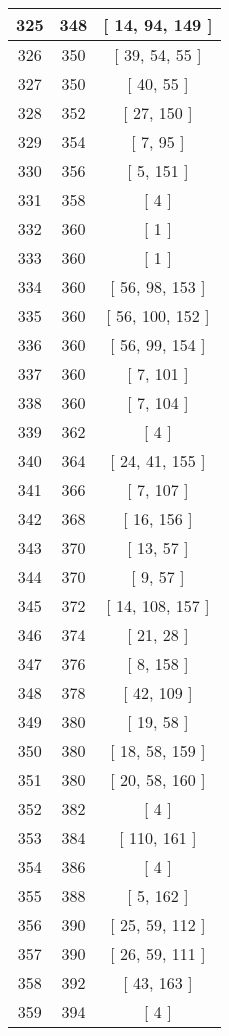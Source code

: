 \begin{center}
\begin{longtable}[H]{|| c c c ||}
\hline
325 & 348 & [ 14, 94, 149 ] \\ 
\hline
326 & 350 & [ 39, 54, 55 ] \\ 
\hline
327 & 350 & [ 40, 55 ] \\ 
\hline
328 & 352 & [ 27, 150 ] \\ 
\hline
329 & 354 & [ 7, 95 ] \\ 
\hline
330 & 356 & [ 5, 151 ] \\ 
\hline
331 & 358 & [ 4 ] \\ 
\hline
332 & 360 & [ 1 ] \\ 
\hline
333 & 360 & [ 1 ] \\ 
\hline
334 & 360 & [ 56, 98, 153 ] \\ 
\hline
335 & 360 & [ 56, 100, 152 ] \\ 
\hline
336 & 360 & [ 56, 99, 154 ] \\ 
\hline
337 & 360 & [ 7, 101 ] \\ 
\hline
338 & 360 & [ 7, 104 ] \\ 
\hline
339 & 362 & [ 4 ] \\ 
\hline
340 & 364 & [ 24, 41, 155 ] \\ 
\hline
341 & 366 & [ 7, 107 ] \\ 
\hline
342 & 368 & [ 16, 156 ] \\ 
\hline
343 & 370 & [ 13, 57 ] \\ 
\hline
344 & 370 & [ 9, 57 ] \\ 
\hline
345 & 372 & [ 14, 108, 157 ] \\ 
\hline
346 & 374 & [ 21, 28 ] \\ 
\hline
347 & 376 & [ 8, 158 ] \\ 
\hline
348 & 378 & [ 42, 109 ] \\ 
\hline
349 & 380 & [ 19, 58 ] \\ 
\hline
350 & 380 & [ 18, 58, 159 ] \\ 
\hline
351 & 380 & [ 20, 58, 160 ] \\ 
\hline
352 & 382 & [ 4 ] \\ 
\hline
353 & 384 & [ 110, 161 ] \\ 
\hline
354 & 386 & [ 4 ] \\ 
\hline
355 & 388 & [ 5, 162 ] \\ 
\hline
356 & 390 & [ 25, 59, 112 ] \\ 
\hline
357 & 390 & [ 26, 59, 111 ] \\ 
\hline
358 & 392 & [ 43, 163 ] \\ 
\hline
359 & 394 & [ 4 ] \\ 

\end{longtable}
\end{center}
